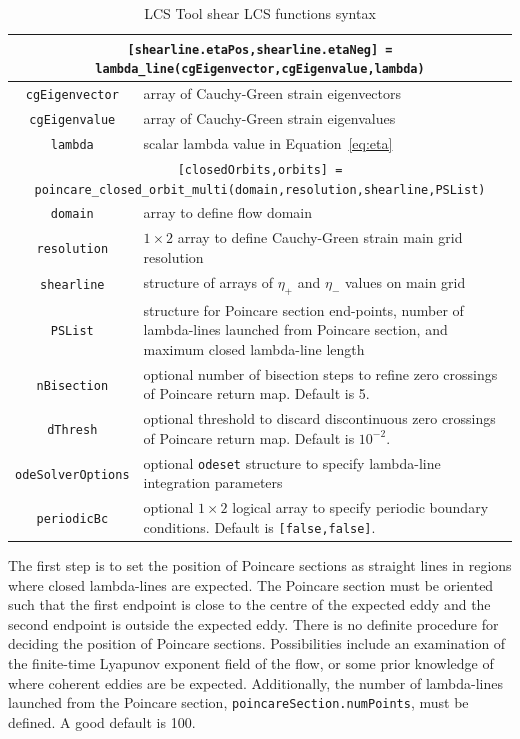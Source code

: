 \documentclass{article}
\begin{document}
\begin{table}
\begin{tabular}{|c|p{}|}
\hline \hline
\multicolumn{2}{|p{\textwidth}|}{\lstinline![shearline.etaPos,shearline.etaNeg] = lambda_line(cgEigenvector,cgEigenvalue,lambda)!}\\
\hline
\lstinline!cgEigenvector! & array of Cauchy-Green strain eigenvectors\\
\hline
\lstinline!cgEigenvalue! & array of Cauchy-Green strain eigenvalues\\
\hline
\lstinline!lambda! & scalar lambda value in Equation~\eqref{eq:eta}\\
\hline \hline
\multicolumn{2}{|p{\textwidth}|}{\lstinline![closedOrbits,orbits] = poincare_closed_orbit_multi(domain,resolution,shearline,PSList)!}\\
\hline
\lstinline!domain! & array to define flow domain\\
\hline
\lstinline!resolution! & $1 \times 2$ array to define Cauchy-Green strain main grid resolution\\
\hline
\lstinline!shearline! & structure of arrays of $\eta_+$ and $\eta_-$ values on main grid\\
\hline
\lstinline!PSList! & structure for Poincare section end-points, number of lambda-lines launched from Poincare section, and maximum closed lambda-line length\\
\hline
\lstinline!nBisection! & optional number of bisection steps to refine zero crossings of Poincare return map. Default is 5.\\
\hline
\lstinline!dThresh! & optional threshold to discard discontinuous zero crossings of Poincare return map. Default is $10^{-2}$.\\
\hline
\lstinline!odeSolverOptions! & optional \lstinline!odeset! structure to specify lambda-line integration parameters\\
\hline
\lstinline!periodicBc! & optional $1 \times 2$ logical array to specify periodic boundary conditions. Default is \lstinline![false,false]!.\\
\hline \hline
\end{tabular}
\caption{LCS Tool shear LCS functions syntax}
\label{t:Shear LCS functions}
\end{table}

The first step is to set the position of Poincare sections as straight lines in regions where closed lambda-lines are expected. The Poincare section must be oriented such that the first endpoint is close to the centre of the expected eddy and the second endpoint is outside the expected eddy. There is no definite procedure for deciding the position of Poincare sections. Possibilities include an examination of the finite-time Lyapunov exponent field of the flow, or some prior knowledge of where coherent eddies are be expected. Additionally, the number of lambda-lines launched from the Poincare section, \lstinline!poincareSection.numPoints!, must be defined. A good default is 100.
\end{document}
